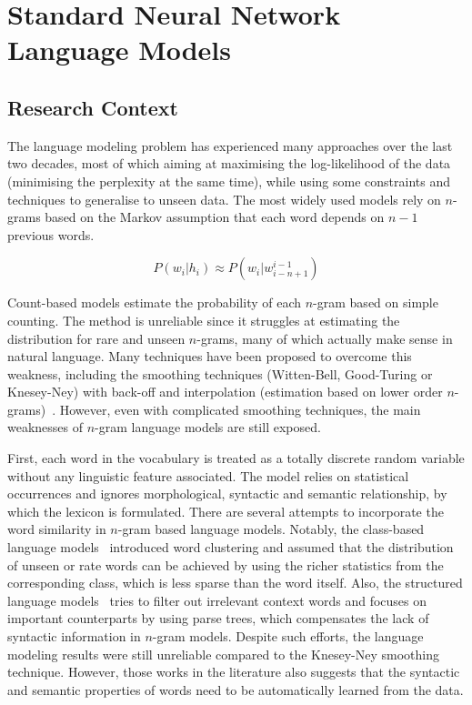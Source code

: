 \section{Standard Neural Network Language Models}


\subsection{Research Context}
The language modeling problem has experienced many approaches over the last two decades, most of which aiming at maximising the log-likelihood of the data (minimising the perplexity at the same time), while using some constraints and techniques to generalise to unseen data. The most widely used models rely on $n$-grams based on the Markov assumption that each word depends on $n-1$ previous words. 

\begin{equation}
\label{eq:markov}
P(w_i|h_i) \approx P(w_i|w_{i-n+1}^{i-1})
\end{equation}

Count-based models estimate the probability of each $n$-gram based on simple counting. The method is unreliable since it struggles at estimating the distribution for rare and unseen $n$-grams, many of which actually make sense in natural language. Many techniques have been proposed to overcome this weakness, including the smoothing techniques (Witten-Bell, Good-Turing or Knesey-Ney) with back-off and interpolation (estimation based on lower order $n$-grams)~\cite{kneser1995improved,chen1999empirical,heafield2011kenlm,federico2008irstlm,ney1994structuring,witten1991zero}. However, even with complicated smoothing techniques, the main weaknesses of $n$-gram language models are still exposed.

First, each word in the vocabulary is treated as a totally discrete random variable without any linguistic feature associated. The model relies on statistical occurrences and ignores morphological, syntactic and semantic relationship, by which the lexicon is formulated. There are several attempts to incorporate the word similarity in $n$-gram based language models. Notably, the class-based language models~\cite{brown1992class,niesler1996variable} introduced word clustering and assumed that the distribution of unseen or rate words can be achieved by using the richer statistics from the corresponding class, which is less sparse than the word itself. Also, the structured language models~\cite{chelba2000structured,filimonov2009joint} tries to filter out irrelevant context words and focuses on important counterparts by using parse trees, which compensates the lack of syntactic information in $n$-gram models. Despite such efforts, the language modeling results were still unreliable compared to the Knesey-Ney smoothing technique. However, those works in the literature also suggests that the syntactic and semantic properties of words need to be automatically learned from the data. 

